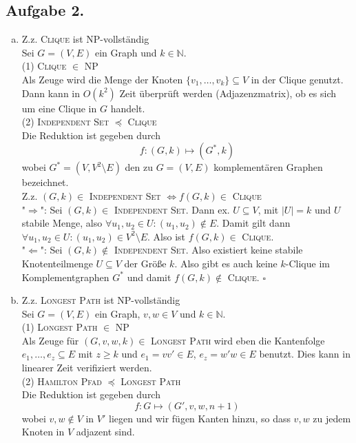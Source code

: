 \documentclass[11pt,a4paper,ngerman]{article}
\begin{document}
\subsection*{Aufgabe 2.}
\begin{enumerate}[a)]
\item Z.z. \textsc{Clique} ist NP-vollständig \\
Sei $G = (V,E)$ ein Graph und $k \in \mathbb{N}$.\\
(1) \textsc{Clique} $\in$ NP \\
Als Zeuge wird die Menge der Knoten $\{v_1,\ldots,v_k \} \subseteq V $ in der Clique genutzt. Dann kann in $O(k^2)$ Zeit überprüft werden (Adjazenzmatrix), ob es sich um eine Clique in $G$ handelt.\\
(2) \textsc{Independent Set} $\preceq$ \textsc{Clique} \\
Die Reduktion ist gegeben durch
$$ f: (G, k) \mapsto (G^*, k)$$
wobei $G^* = (V, V^2 \setminus E)$ den zu $G = (V,E)$ komplementären Graphen bezeichnet. \\
Z.z. $(G,k) \in $ \textsc{Independent Set} $\Leftrightarrow f(G,k) \in $ \textsc{Clique}\\
"$\Rightarrow$": Sei $(G,k) \in$ \textsc{Independent Set}.
Dann ex. $U \subseteq V$, mit $|U| = k$ und $U$ stabile Menge, also $\forall u_1, u_2 \in U: (u_1,u_2) \notin E$. Damit gilt dann $\forall u_1, u_2 \in U: (u_1,u_2) \in V^2 \setminus E$. Also ist $f(G,k) \in$ \textsc{Clique}. \\
"$\Leftarrow$": Sei $(G,k) \notin$ \textsc{Independent Set}.
Also existiert keine stabile Knotenteilmenge $U \subseteq V$ der Größe $k$. Also gibt es auch keine $k$-Clique im Komplementgraphen $G^*$ und damit $f(G,k) \notin$ \textsc{Clique}.
\mbox{} \hfill $\square$
\item Z.z. \textsc{Longest Path} ist NP-vollständig \\
Sei $G = (V,E)$ ein Graph, $v,w \in V$ und $k \in \mathbb{N}$. \\
(1) \textsc{Longest Path} $\in$ NP \\
Als Zeuge für $(G,v,w,k) \in$ \textsc{Longest Path} wird eben die Kantenfolge $e_1,\ldots,e_z \subseteq E$ mit $z \geq k$ und $e_1 = vv' \in E$, $e_z = w'w \in E$ benutzt. Dies kann in linearer Zeit verifiziert werden. \\
(2) \textsc{Hamilton Pfad} $\preceq$ \textsc{Longest Path} \\
Die Reduktion ist gegeben durch
$$ f: G \mapsto (G',v,w,n+1)$$
wobei $v,w \not\in V$ in $V'$ liegen und wir fügen Kanten hinzu, so dass $v,w$ zu jedem Knoten in $V$ adjazent sind. \\

\end{enumerate}
\end{document}
